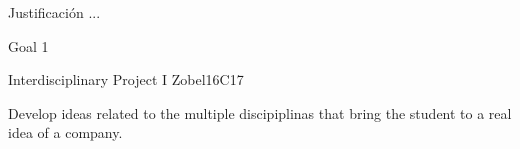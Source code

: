 \begin{syllabus}


\begin{justification}
Justificación ...
\end{justification}

\begin{goals}
\item Goal 1
\end{goals}

\begin{outcomes}
   \item {}
\end{outcomes}

\begin{competences}
    \item {}
\end{competences}

\begin{unit}{Interdisciplinary Project  I }{}{Zobel}{16}{C17}
\begin{topics}
      \item Develop ideas related to the multiple discipiplinas that bring the student to a real idea of a company.
\end{topics}

\begin{learningoutcomes}
   \item 
\end{learningoutcomes}
\end{unit}



\begin{coursebibliography}
\end{coursebibliography}

\end{syllabus}
